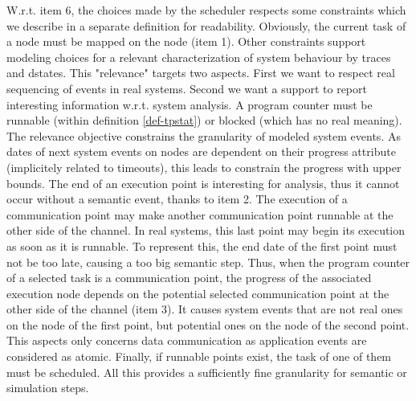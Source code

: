 \documentclass{article}
\begin{document}
W.r.t. item 6, the choices made by the scheduler respects some constraints which we describe in a separate definition for readability. Obviously, the current task of a node must be mapped on the node (item 1). Other constraints support modeling choices for a relevant characterization of system behaviour by traces and dstates. This "relevance" targets two aspects. First we want to respect real sequencing of events in real systems. Second we want a support to report interesting information w.r.t. system analysis. A program counter must be runnable (within definition \ref{def-tpstat}) or blocked (which has no real meaning). The relevance objective constrains the granularity of modeled system events. As dates of next system events on nodes are dependent on their progress attribute (implicitely related to timeouts), this leads to constrain the progress with upper bounds. The end of an execution point is interesting for analysis, thus it cannot occur without a semantic event, thanks to item 2. The execution of a communication point may make another communication point runnable at the other side of the channel. In real systems, this last point may begin its execution as soon as it is runnable. To represent this, the end date of the first point must not be too late, causing a too big semantic step. Thus, when the program counter of a selected task is a communication point, the progress of the associated execution node depends on the potential selected communication point at the other side of the channel (item 3). It causes system events that are not real ones on the node of the first point, but potential ones on the node of the second point. This aspects only concerns  data communication as application events are considered as atomic. Finally, if runnable points exist, the task of one of them must be scheduled. All this provides a sufficiently fine granularity for semantic or simulation steps. 
\end{document}
